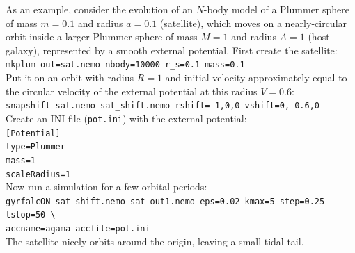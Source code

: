 \documentclass[12pt]{article}
\begin{document}
As an example, consider the evolution of an $N$-body model of a Plummer sphere of mass $m=0.1$ and radius $a=0.1$ (satellite), which moves on a nearly-circular orbit inside a larger Plummer sphere of mass $M=1$ and radius $A=1$ (host galaxy), represented by a smooth external potential. First create the satellite:\\[2mm]
\texttt{mkplum out=sat.nemo nbody=10000 r_s=0.1 mass=0.1}\\[2mm]
Put it on an orbit with radius $R=1$ and initial velocity approximately equal to the circular velocity of the external potential at this radius $V=0.6$:\\[2mm]
\texttt{snapshift sat.nemo sat_shift.nemo rshift=-1,0,0 vshift=0,-0.6,0}\\[2mm]
Create an INI file (\texttt{pot.ini}) with the external potential:\\[2mm]
\texttt{[Potential]\\type=Plummer\\mass=1\\scaleRadius=1}\\[2mm]
Now run a simulation for a few orbital periods:\\[2mm]
\texttt{gyrfalcON sat_shift.nemo sat_out1.nemo eps=0.02 kmax=5 step=0.25 tstop=50 \textbackslash \\
\makebox[7mm]{} accname=agama accfile=pot.ini}\\[2mm]
The satellite nicely orbits around the origin, leaving a small tidal tail.
\end{document}
